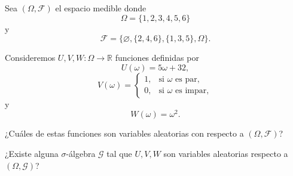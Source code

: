 \documentclass[12pt,a4paper]{article}
\begin{document}
    \begin{mdframed}[style=mdpinkbox,frametitle={Ejercicio 4}]
        Sea $(\Omega,\mathcal{F})$ el espacio medible donde
        \[
        \Omega=\{1,2,3,4,5,6\}
        \]
        y
        \[
        \mathcal{F}=\{\varnothing,\{2,4,6\},\{1,3,5\},\Omega\}.
        \]

        Consideremos $U,V,W:\Omega\to\mathbb{R}$ funciones definidas por
        \[
        U(\omega)=5\omega+32,
        \]
        \[
        V(\omega)=
        \begin{cases}
            1, & \text{si } \omega \text{ es par},\\
            0, & \text{si } \omega \text{ es impar},
        \end{cases}
        \]
        y
        \[
        W(\omega)=\omega^{2}.
        \]

        ¿Cuáles de estas funciones son variables aleatorias con respecto a $(\Omega,\mathcal{F})$?

        ¿Existe alguna $\sigma$-álgebra $\mathcal{G}$ tal que $U,V,W$ son variables aleatorias respecto a $(\Omega,\mathcal{G})$?
    \end{mdframed}
\end{document}

